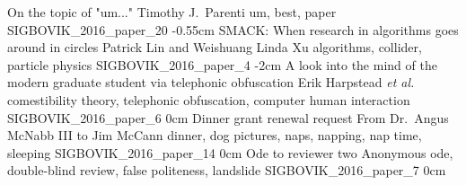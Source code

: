 \addpaper
	{On the topic of "um..."}
	{Timothy J.\ Parenti}
	{um, best, paper}
	{SIGBOVIK_2016_paper_20}
	{-0.55cm}
	{}
\addpaper
	{SMACK: When research in algorithms goes around in circles}
	{Patrick Lin and Weishuang Linda Xu}
	{algorithms, collider, particle physics}
	{SIGBOVIK_2016_paper_4}
	{-2cm}
	{}
\addpaper
	{A look into the mind of the modern graduate student via telephonic obfuscation}
	{Erik Harpstead \textit{et al.}}
	{comestibility theory, telephonic obfuscation, computer human interaction}
	{SIGBOVIK_2016_paper_6}
	{0cm}
	{}
\addpaper
	{Dinner grant renewal request}
	{From Dr.\ Angus McNabb III to Jim McCann}
	{dinner, dog pictures, naps, napping, nap time, sleeping}
	{SIGBOVIK_2016_paper_14}
	{0cm}
	{}
\addpaper
	{Ode to reviewer two}
	{Anonymous}
	{ode, double-blind review, false politeness, landslide}
	{SIGBOVIK_2016_paper_7}
	{0cm}
	{}
